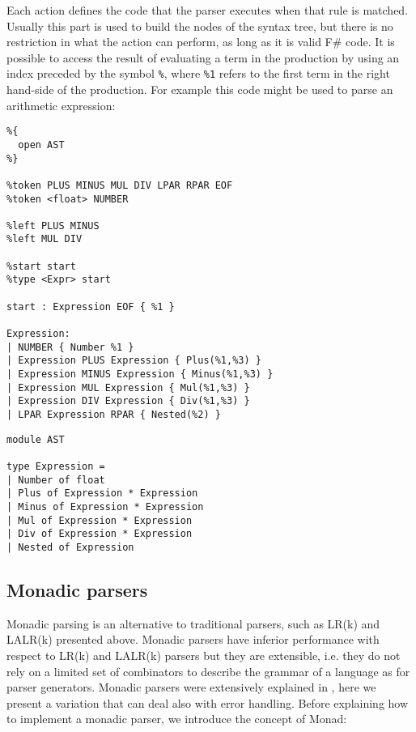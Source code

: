 \noindent
Each action defines the code that the parser executes when that rule is matched. Usually this part is used to build the nodes of the syntax tree, but there is no restriction in what the action can perform, as long as it is valid F\# code. It is possible to access the result of evaluating a term in the production by using an index preceded by the symbol \texttt{\%}, where \texttt{\%1} refers to the first term in the right hand-side of the production. For example this code might be used to parse an arithmetic expression:

\begin{lstlisting}
%{
  open AST
%}

%token PLUS MINUS MUL DIV LPAR RPAR EOF
%token <float> NUMBER

%left PLUS MINUS
%left MUL DIV

%start start
%type <Expr> start

start : Expression EOF { %1 }

Expression:
| NUMBER { Number %1 }
| Expression PLUS Expression { Plus(%1,%3) }
| Expression MINUS Expression { Minus(%1,%3) }
| Expression MUL Expression { Mul(%1,%3) }
| Expression DIV Expression { Div(%1,%3) }
| LPAR Expression RPAR { Nested(%2) }
\end{lstlisting}

\begin{lstlisting}
module AST

type Expression =
| Number of float
| Plus of Expression * Expression
| Minus of Expression * Expression
| Mul of Expression * Expression
| Div of Expression * Expression
| Nested of Expression
\end{lstlisting}



\subsection{Monadic parsers}
\label{sec:ch_background_parser_monad}
Monadic parsing is an alternative to traditional parsers, such as LR(k) and LALR(k) presented above. Monadic parsers have inferior performance with respect to LR(k) and LALR(k) \cite{hutton1998monadic} parsers but they are extensible, i.e. they do not rely on a limited set of combinators to describe the grammar of a language as for parser generators. Monadic parsers were extensively explained in \cite{hutton1998monadic, wadler1995monads}, here we present a variation that can deal also with error handling. Before explaining how to implement a monadic parser, we introduce the concept of Monad:

